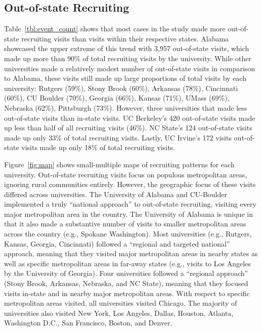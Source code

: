 \documentclass[twoside]{article}
\begin{document}
\subsection*{Out-of-state Recruiting}

Table~\ref{tbl:event_count} shows that most cases in the study made more out-of-state recruiting visits than visits within their respective states. Alabama showcased the upper extreme of this trend with 3,957 out-of-state visits, which made up more than 90\% of total recruiting visits by the university. While other universities made a relatively modest number of out-of-state visits in comparison to Alabama, these visits still made up large proportions of total visits by each university: Rutgers (59\%), Stony Brook (60\%), Arkansas (78\%), Cincinnati (60\%), CU Boulder (70\%), Georgia (66\%), Kansas (71\%), UMass (69\%), Nebraska (62\%), Pittsburgh (73\%). However, three universities that made less out-of-state visits than in-state visits. UC Berkeley's 420 out-of-state visits made up less than half of all recruiting visits (46\%). NC State's 124 out-of-state visits made up only 33\% of total recruiting visits. Lastly, UC Irvine's 172 visits out-of-state visits made up only 18\% of total recruiting visits.

Figure~\ref{fig:map} shows small-multiple maps of recruiting patterns for each university. Out-of-state recruiting visits focus on populous metropolitan areas, ignoring rural communities entirely. However, the geographic focus of these visits differed across universities. The University of Alabama and CU-Boulder implemented a truly ``national approach'' to out-of-state recruiting, visiting every major metropolitan area in the country. The University of Alabama is unique in that it also made a substantive number of visits to smaller metropolitan areas across the country (e.g., Spokane Washington). Most universities (e.g., Rutgers, Kansas, Georgia, Cincinnati) followed a ``regional and targeted national'' approach, meaning that they visited major metropolitan areas in nearby states as well as specific metropolitan areas in far-away states (e.g., visits to Los Angeles by the University of Georgia).  Four universities followed a ``regional approach'' (Stony Brook, Arkansas, Nebraska, and NC State), meaning that they focused visits in-state and in nearby major metropolitan areas.  With respect to specific metropolitan areas visited, all universities visited Chicago. The majority of universities also visited New York, Los Angeles, Dallas, Houston, Atlanta, Washington D.C., San Francisco, Boston, and Denver.
\end{document}
